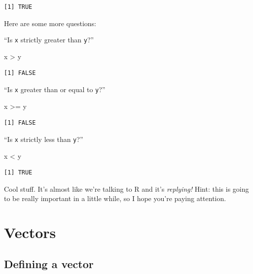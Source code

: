 \documentclass[
  letterpaper,
  DIV=11,
  numbers=noendperiod]{scrreprt}
\newenvironment{Shaded}{\begin{snugshade}}{\end{snugshade}}
\newcommand{\NormalTok}[1]{\textcolor[rgb]{0.00,0.23,0.31}{#1}}
\newcommand{\SpecialCharTok}[1]{\textcolor[rgb]{0.37,0.37,0.37}{#1}}
\begin{document}
\begin{verbatim}
[1] TRUE
\end{verbatim}

Here are some more questions:

``Is \texttt{x} strictly greater than \texttt{y}?''

\begin{Shaded}
\begin{Highlighting}[]
\NormalTok{x }\SpecialCharTok{\textgreater{}}\NormalTok{ y}
\end{Highlighting}
\end{Shaded}

\begin{verbatim}
[1] FALSE
\end{verbatim}

``Is \texttt{x} greater than or equal to \texttt{y}?''

\begin{Shaded}
\begin{Highlighting}[]
\NormalTok{x }\SpecialCharTok{\textgreater{}=}\NormalTok{ y}
\end{Highlighting}
\end{Shaded}

\begin{verbatim}
[1] FALSE
\end{verbatim}

``Is \texttt{x} strictly less than \texttt{y}?''

\begin{Shaded}
\begin{Highlighting}[]
\NormalTok{x }\SpecialCharTok{\textless{}}\NormalTok{ y}
\end{Highlighting}
\end{Shaded}

\begin{verbatim}
[1] TRUE
\end{verbatim}

Cool stuff. It's almost like we're talking to R and it's
\emph{replying!} Hint: this is going to be really important in a little
while, so I hope you're paying attention.

\chapter{Vectors}\label{vectors}

\section{Defining a vector}\label{defining-a-vector}
\end{document}
